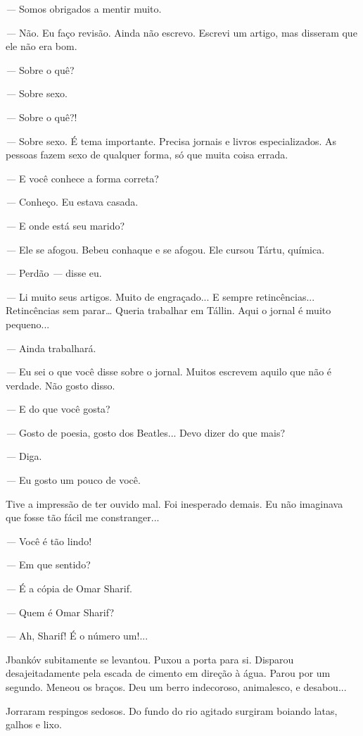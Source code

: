 \emph{---} Somos obrigados a mentir muito.

\emph{---} Não. Eu faço revisão. Ainda não escrevo. Escrevi um artigo,
mas disseram que ele não era bom.

\emph{---} Sobre o quê?

\emph{---} Sobre sexo.

\emph{---} Sobre o quê?!

\emph{---} Sobre sexo. É tema importante. Precisa jornais e livros
especializados. As pessoas fazem sexo de qualquer forma, só que muita
coisa errada.

\emph{---} E você conhece a forma correta?

\emph{---} Conheço. Eu estava casada.

\emph{---} E onde está seu marido?

\emph{---} Ele se afogou. Bebeu conhaque e se afogou. Ele cursou Tártu,
química.

\emph{---} Perdão \emph{---} disse eu.

\emph{---} Li muito seus artigos. Muito de engraçado... E sempre
retincências... Retincências sem parar\ldots{} Queria trabalhar em
Tállin. Aqui o jornal é muito pequeno...

\emph{---} Ainda trabalhará.

\emph{---} Eu sei o que você disse sobre o jornal. Muitos escrevem
aquilo que não é verdade. Não gosto disso.

\emph{---} E do que você gosta?

\emph{---} Gosto de poesia, gosto dos Beatles... Devo dizer do que mais?

\emph{---} Diga.

\emph{---} Eu gosto um pouco de você.

Tive a impressão de ter ouvido mal. Foi inesperado demais. Eu não
imaginava que fosse tão fácil me constranger...

\emph{---} Você é tão lindo!

\emph{---} Em que sentido?

\emph{---} É a cópia de Omar Sharif.

\emph{---} Quem é Omar Sharif?

\emph{---} Ah, Sharif! É o número um!...

Jbankóv subitamente se levantou. Puxou a porta para si. Disparou
desajeitadamente pela escada de cimento em direção à água. Parou por um
segundo. Meneou os braços. Deu um berro indecoroso, animalesco, e
desabou...

Jorraram respingos sedosos. Do fundo do rio agitado surgiram boiando
latas, galhos e lixo.

